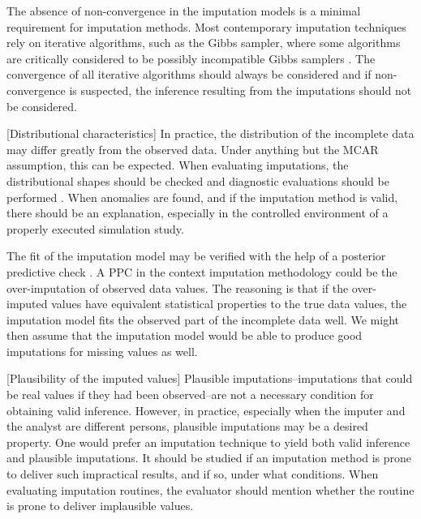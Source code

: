 \documentclass[bimj,fleqn]{w-art}
\begin{document}
The absence of non-convergence in the imputation models is a minimal requirement for imputation methods. Most contemporary imputation techniques rely on iterative algorithms, such as the Gibbs sampler, where some algorithms are critically considered to be possibly incompatible Gibbs samplers \citep[PIGS,][]{li2012imputing}. The convergence of all iterative algorithms should always be considered and if non-convergence is suspected, the inference resulting from the imputations should not be considered. 

[Distributional characteristics] In practice, the distribution of the incomplete data may differ greatly from the observed data. Under anything but the MCAR assumption, this can be expected. When evaluating imputations, the distributional shapes should be checked and diagnostic evaluations should be performed \citep[see][for a detailed overview of diagnostic evaluation for multivariate imputations]{abayomi2008diagnostics}. When anomalies are found, and if the imputation method is valid, there should be an explanation, especially in the controlled environment of a properly executed simulation study. 

The fit of the imputation model may be verified with the help of a posterior predictive check \citep[PPC][]{nguy17, zhao22}. A PPC in the context imputation methodology could be the over-imputation of observed data values. The reasoning is that if the over-imputed values have  equivalent statistical properties to the true data values, the imputation model fits the observed part of the incomplete data well. We might then assume that the imputation model would be able to produce good imputations for missing values as well. 

[Plausibility of the imputed values] Plausible imputations--imputations that could be real values if they had been observed--are not a necessary condition for obtaining valid inference. However, in practice, especially when the imputer and the analyst are different persons, plausible imputations may be a desired property. One would prefer an imputation technique to yield both valid inference and plausible imputations. It should be studied if an imputation method is prone to deliver such impractical results, and if so, under what conditions. When evaluating imputation routines, the evaluator should mention whether the routine is prone to deliver implausible values. 



\end{document}
